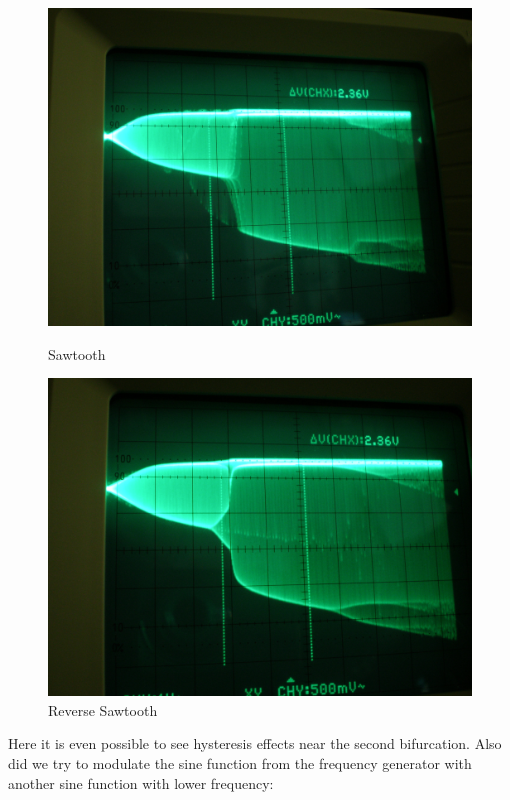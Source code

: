 \begin{figure}[H]
\begin{minipage}{0.5\textwidth}
\centering \includegraphics[width=\textwidth]{Fotos2/13.JPG}
\caption{Sawtooth}
\end{minipage}
\begin{minipage}{0.5\textwidth}
\centering \includegraphics[width=\textwidth]{Fotos2/15.JPG}
\caption{Reverse Sawtooth}
\end{minipage}
\end{figure}

Here it is even possible to see hysteresis effects near the second bifurcation. Also did we try to modulate the sine function from the frequency generator with another sine function with lower frequency:

